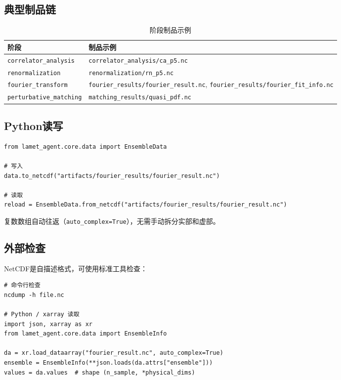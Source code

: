 \documentclass[12pt,a4paper]{ctexart}
\begin{document}
\subsection{典型制品链}

\begin{table}[H]
\centering
\caption{阶段制品示例}
\label{tab:artifacts}
\begin{tabular}{@{}ll@{}}
\toprule
\textbf{阶段} & \textbf{制品示例} \\
\midrule
\texttt{correlator\_analysis} & \texttt{correlator\_analysis/ca\_p5.nc} \\
\texttt{renormalization} & \texttt{renormalization/rn\_p5.nc} \\
\texttt{fourier\_transform} & \texttt{fourier\_results/fourier\_result.nc}, \texttt{fourier\_results/fourier\_fit\_info.nc} \\
\texttt{perturbative\_matching} & \texttt{matching\_results/quasi\_pdf.nc} \\
\bottomrule
\end{tabular}
\end{table}

\subsection{Python读写}

\begin{lstlisting}[caption={NetCDF数据读写}]
from lamet_agent.core.data import EnsembleData

# 写入
data.to_netcdf("artifacts/fourier_results/fourier_result.nc")

# 读取
reload = EnsembleData.from_netcdf("artifacts/fourier_results/fourier_result.nc")
\end{lstlisting}

复数数组自动往返（\texttt{auto\_complex=True}），无需手动拆分实部和虚部。

\subsection{外部检查}

NetCDF是自描述格式，可使用标准工具检查：

\begin{lstlisting}[caption={使用外部工具检查NetCDF}]
# 命令行检查
ncdump -h file.nc

# Python / xarray 读取
import json, xarray as xr
from lamet_agent.core.data import EnsembleInfo

da = xr.load_dataarray("fourier_result.nc", auto_complex=True)
ensemble = EnsembleInfo(**json.loads(da.attrs["ensemble"]))
values = da.values  # shape (n_sample, *physical_dims)
\end{lstlisting}
\end{document}
